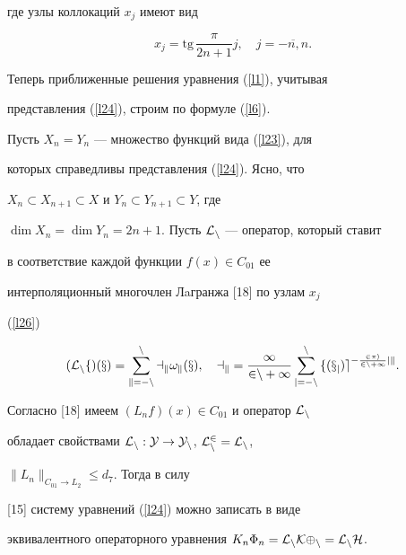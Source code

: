 где узлы коллокаций $x_j$ имеют вид


\begin{equation}


\label{l26} x_j=\mathrm{tg}\, \frac{\pi}{2n+1}j, \quad j=\overline{-n,n}.


\end{equation}


Теперь приближенные решения уравнения (\ref{l1}), учитывая


представления (\ref{l24}), строим по формуле (\ref{l6}).





Пусть $X_n=Y_n$ --- множество функций вида (\ref{l23}), для


которых справедливы представления (\ref{l24}). Ясно, что


$X_n\subset X_{n+1}\subset X$ и $Y_n\subset Y_{n+1}\subset Y$, где


$\dim X_n=\dim Y_n=2n+1$. Пусть $\cal L_n$ --- оператор, который ставит


в соответствие каждой функции $f(x)\in C_{01}$ ее


интерполяционный многочлен Лaгранжа [18] по узлам $x_j$


(\ref{l26})


\begin{equation}


\label{l27} (\cal L_nf)(x)=\sum\limits_{k=-n}^n a_k\omega_k(x), \quad


a_k=\frac{1}{2n+1} \sum\limits_{j=-n}^{n} f(x_j)e^{-\frac{2\pi


i}{2n+1}jk}.


\end{equation}


Согласно [18] имеем $(L_nf)(x) \in C_{01}$ и оператор $\cal L_n$


обладает свойствами $\cal L_n:  Y\rightarrow Y_n$,  $\cal L_n^2=\cal L_n$,


$\|L_n\|_{C_{01}\rightarrow L_2}\leqslant d_7$. Тогда в силу


[15] систему уравнений (\ref{l24}) можно записать в виде


эквивалентного операторного уравнения $K_n\Phi_n=\cal L_nK\Phi_n=\cal L_nH$.








